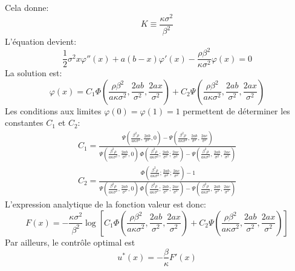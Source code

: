 Cela donne:
\[
K\equiv\frac{\kappa \sigma^2}{\beta^2}
\]
L'équation devient:
\begin{equation}\label{eq_exemple1}
    \frac{1}{2}\sigma^2 x\varphi''(x) + a(b - x)\varphi'(x) - \frac{\rho\beta^2}{\kappa \sigma^2}\varphi(x) = 0
\end{equation}
La solution est:
\[
\varphi(x)=C_1\Phi\left(\frac{\rho\beta^2}{a\kappa \sigma^2},\frac{2ab}{\sigma^2},\frac{2ax}{\sigma^2}\right) + C_2\Psi\left(\frac{\rho\beta^2}{a\kappa \sigma^2},\frac{2ab}{\sigma^2},\frac{2ax}{\sigma^2}\right)
\]
Les conditions aux limites $\varphi(0)=\varphi(1)=1$ permettent de déterminer les constantes $C_1$ et $C_2$:
\begin{equation}\label{control_constants}
    \begin{aligned}
        C_1=\frac{\Psi\left(\frac{\beta ^2 \rho }{a \kappa  \sigma ^2},\frac{2 a b}{\sigma ^2},0\right)-\Psi\left(\frac{\beta ^2 \rho }{a \kappa  \sigma ^2},\frac{2 a b}{\sigma ^2},\frac{2 a c}{\sigma ^2}\right)}{\Psi\left(\frac{\beta ^2 \rho }{a \kappa  \sigma ^2},\frac{2 a b}{\sigma ^2},0\right) \, \Phi\left(\frac{\beta ^2 \rho }{a \kappa  \sigma ^2};\frac{2 a b}{\sigma ^2};\frac{2 a c}{\sigma ^2}\right)-\Psi\left(\frac{\beta ^2 \rho }{a \kappa  \sigma ^2},\frac{2 a b}{\sigma ^2},\frac{2 a c}{\sigma ^2}\right)} \\
        C_2= \frac{\, \Phi\left(\frac{\beta ^2 \rho }{a \kappa  \sigma ^2};\frac{2 a b}{\sigma ^2};\frac{2 a c}{\sigma ^2}\right)-1}{\Psi\left(\frac{\beta ^2 \rho }{a \kappa  \sigma ^2},\frac{2 a b}{\sigma ^2},0\right) \, \Phi\left(\frac{\beta ^2 \rho }{a \kappa  \sigma ^2};\frac{2 a b}{\sigma ^2};\frac{2 a c}{\sigma ^2}\right)-\Psi\left(\frac{\beta ^2 \rho }{a \kappa  \sigma ^2},\frac{2 a b}{\sigma ^2},\frac{2 a c}{\sigma ^2}\right)}
    \end{aligned}
\end{equation}
L'expression analytique de la fonction valeur est donc:
\begin{equation}\label{sol_control_1}
    F(x)=-\frac{\kappa \sigma^2}{\beta^2} \log\left[C_1\Phi\left(\frac{\rho\beta^2}{a\kappa \sigma^2},\frac{2ab}{\sigma^2},\frac{2ax}{\sigma^2}\right) + C_2\Psi\left(\frac{\rho\beta^2}{a\kappa \sigma^2},\frac{2ab}{\sigma^2},\frac{2ax}{\sigma^2}\right)\right]
\end{equation}
Par ailleurs, le contrôle optimal est
\begin{equation}\label{optimal_control_1}
    u^*(x)=-\frac{\beta}{\kappa}F'(x)
\end{equation}

